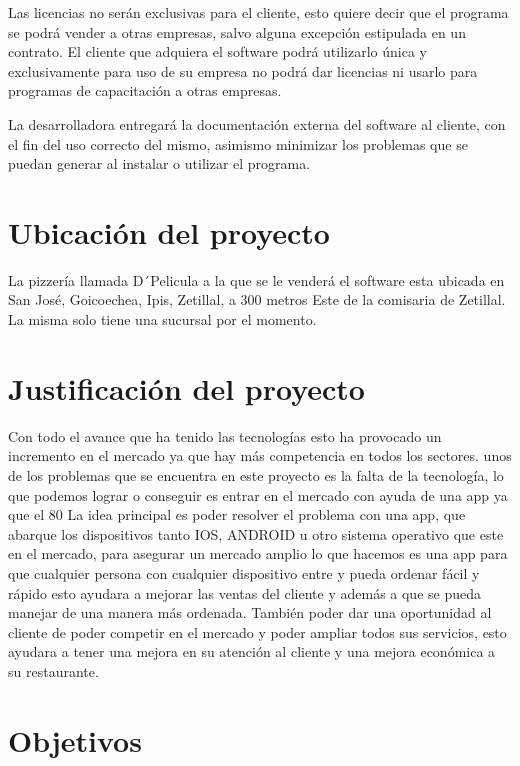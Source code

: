 \documentclass[conference]{IEEEtran}
\begin{document}
Las licencias no serán exclusivas para el cliente, esto quiere decir que el programa se podrá vender a otras empresas, salvo alguna excepción estipulada en un contrato. El cliente que adquiera el software podrá utilizarlo única y exclusivamente para uso de su empresa no podrá dar licencias ni usarlo para programas de capacitación a otras empresas.

La desarrolladora entregará la documentación externa del software al cliente, con el fin del uso correcto del mismo, asimismo minimizar los problemas que se puedan generar al instalar o utilizar el programa.

\section{Ubicación del proyecto}

La pizzería llamada D´Pelicula a la que se le venderá el software esta ubicada en San José, Goicoechea, Ipis, Zetillal, a 300 metros Este de la comisaria de Zetillal.
La misma solo tiene una sucursal por el momento.

\section{Justificación del proyecto}

Con todo el avance que ha tenido las tecnologías esto ha provocado un incremento en el mercado ya que hay más competencia en todos los sectores. unos de los problemas que se encuentra en este proyecto es la falta de la tecnología, lo que podemos lograr o conseguir es entrar en el mercado con ayuda de una app ya que el 80 %
La idea principal es poder resolver el problema con una app, que abarque los dispositivos tanto IOS, ANDROID u otro sistema operativo que este en el mercado, para asegurar un mercado amplio lo que hacemos es una app para que cualquier persona con cualquier dispositivo entre y pueda ordenar fácil y rápido esto ayudara a mejorar las ventas del cliente y además a que se pueda manejar de una manera más ordenada. También poder dar una oportunidad al cliente de poder competir en el mercado y poder ampliar todos sus servicios, esto ayudara a tener una mejora en su atención al cliente y una mejora económica a su restaurante. 

\section{Objetivos}
\end{document}
